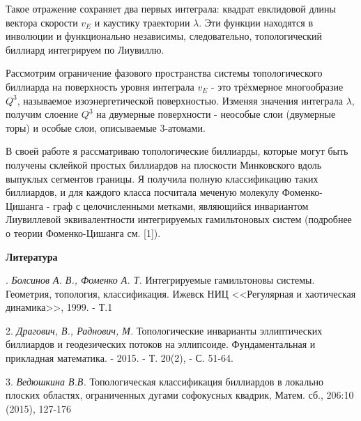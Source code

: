 Такое отражение сохраняет два первых интеграла: квадрат евклидовой длины вектора скорости $v_E$ и каустику траектории $\lambda$. Эти функции находятся в инволюции и функционально независимы, следовательно, топологический биллиард интегрируем по Лиувиллю.

Рассмотрим ограничение фазового пространства системы топологического биллиарда на поверхность уровня интеграла $v_E$ - это трёхмерное многообразие $Q^3$, называемое изоэнергетической поверхностью. Изменяя значения интеграла $\lambda$, получим слоение $Q^3$ на двумерные поверхности - неособые слои (двумерные торы) и особые слои, описываемые 3-атомами.

В своей работе я рассматриваю топологические биллиарды, которые могут быть получены склейкой простых биллиардов на плоскости Минковского вдоль выпуклых сегментов границы. Я получила полную классификацию таких биллиардов, и для каждого класса посчитала меченую молекулу Фоменко-Цишанга - граф с целочисленными метками, являющийся инвариантом Лиувиллевой эквивалентности интегрируемых гамильтоновых систем (подробнее о теории Фоменко-Цишанга см. [1]).





\smallskip \centerline {\bf Литература} . {\it Болсинов А. В., Фоменко А. Т.} Интегрируемые гамильтоновы системы. Геометрия, топология, классификация. Ижевск НИЦ <<Регулярная и хаотическая динамика>>, 1999. - Т.1


2. {\it Драгович, В., Раднович, М.} Топологические инварианты эллиптических биллиардов и геодезических потоков на эллипсоиде. Фундаментальная и прикладная математика. - 2015. - Т. 20(2), - С. 51-64.

3. {\it Ведюшкина В.В.} Топологическая классификация биллиардов в локально плоских областях,
ограниченных дугами софокусных квадрик, Матем. сб., 206:10 (2015), 127-176
